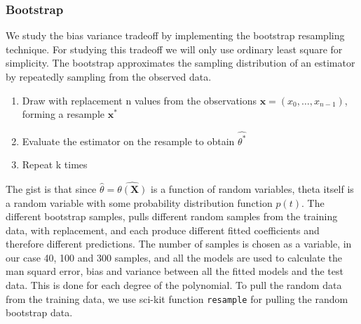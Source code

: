 \documentclass[aps,rmp,reprint,amsmath,amssymb,longbibliography]{revtex4-1}
\begin{document}
\subsubsection{Bootstrap}
We study the bias variance tradeoff by implementing the bootstrap resampling technique.
For studying this tradeoff we will only use ordinary least square for simplicity.
The bootstrap approximates the sampling distribution of an estimator by repeatedly sampling
from the observed data.
\begin{enumerate}
    \item Draw with replacement n values from the observations
    $\boldsymbol{x} = (x_0,\ldots,x_{n-1})$, forming a resample $\boldsymbol{x^*}$
    \item Evaluate the estimator on the resample to obtain $\hat{\theta^*}$
    \item Repeat k times
\end{enumerate}
\cite[p.~65]{LectureNotes}
The gist is that since $\hat{\theta} = \hat{\theta(\boldsymbol{X})}$ is
a function of random variables, theta itself is a random variable with some
probability distribution function $p(t)$. The different bootstrap samples,
pulls different random samples from the training data, with replacement,
and each produce different fitted coefficients and therefore different predictions.
The number of samples is chosen as a variable, in our case 40, 100 and 300 samples,
and all the models are used to calculate the man squard error, bias and variance between
all the fitted models and the test data. This is done for each degree of the polynomial.
To pull the random data from the training data, we use sci-kit function \texttt{resample}
for pulling the random bootstrap data.
\end{document}
